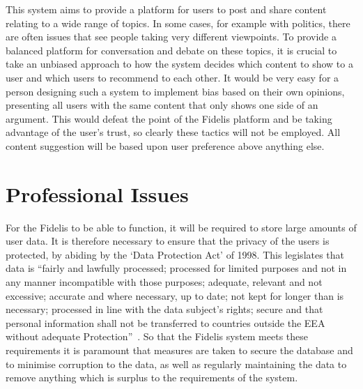 This system aims to provide a platform for users to post and share content relating to a wide range of topics. In some cases, for example with politics, there are often issues that see people taking very different viewpoints. To provide a balanced platform for conversation and debate on these topics, it is crucial to take an unbiased approach to how the system decides which content to show to a user and which users to recommend to each other. It would be very easy for a person designing such a system to implement bias based on their own opinions, presenting all users with the same content that only shows one side of an argument. This would defeat the point of the Fidelis platform and be taking advantage of the user’s trust, so clearly these tactics will not be employed. All content suggestion will be based upon user preference above anything else.

\section{Professional Issues}
For the Fidelis to be able to function, it will be required to store large amounts of user data. It is therefore necessary to ensure that the privacy of the users is protected, by abiding by the `Data Protection Act' of 1998. This legislates that data is ``fairly and lawfully processed; processed for limited purposes and not in any manner incompatible with those purposes;
adequate, relevant and not excessive; accurate and where necessary, up to date; not kept for longer than is necessary; processed in line with the data subject's rights; secure and that personal information shall not be transferred to countries outside the EEA without adequate
Protection''~\cite{DPA}. So that the Fidelis system meets these requirements it is paramount that measures are taken to secure the database and to minimise corruption to the data, as well as regularly maintaining the data to remove anything which is surplus to the requirements of the system.